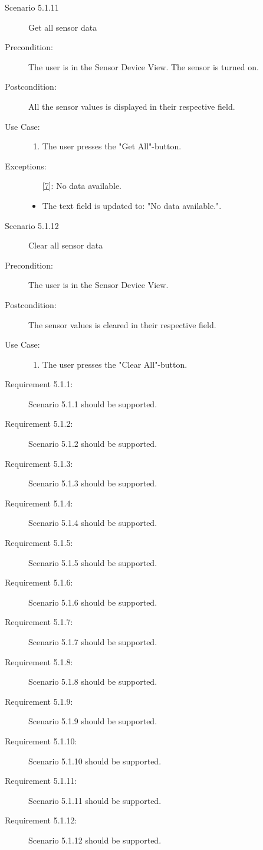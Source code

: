 \documentclass[a4paper]{article}
\begin{document}
\begin{description}
\item[Scenario 5.1.11] Get all sensor data
\item[Precondition:] The user is in the Sensor Device View. The sensor is turned on.
\item[Postcondition:] All the sensor values is displayed in their respective field.
\item[Use Case:]\mbox{}
\begin{enumerate}
\item \label{7} The user presses the "Get All"-button.

\end{enumerate}

\item[Exceptions:]
\item[]

\begin{itemize}
\item [\ref{7}:] No data available.
\item The text field is updated to: "No data available.".
\end{itemize}

\item[]

\item[Scenario 5.1.12] Clear all sensor data
\item[Precondition:] The user is in the Sensor Device View.
\item[Postcondition:] The sensor values is cleared in their respective field.
\item[Use Case:]\mbox{}
\begin{enumerate}
\item \label{7} The user presses the "Clear All"-button.
\end{enumerate}

\item[Requirement 5.1.1:] Scenario 5.1.1 should be supported.
\item[Requirement 5.1.2:] Scenario 5.1.2 should be supported.
\item[Requirement 5.1.3:] Scenario 5.1.3 should be supported.
\item[Requirement 5.1.4:] Scenario 5.1.4 should be supported.
\item[Requirement 5.1.5:] Scenario 5.1.5 should be supported.
\item[Requirement 5.1.6:] Scenario 5.1.6 should be supported.
\item[Requirement 5.1.7:] Scenario 5.1.7 should be supported.
\item[Requirement 5.1.8:] Scenario 5.1.8 should be supported.
\item[Requirement 5.1.9:] Scenario 5.1.9 should be supported.
\item[Requirement 5.1.10:] Scenario 5.1.10 should be supported.
\item[Requirement 5.1.11:] Scenario 5.1.11 should be supported.
\item[Requirement 5.1.12:] Scenario 5.1.12 should be supported.

\end{description}
\end{document}
